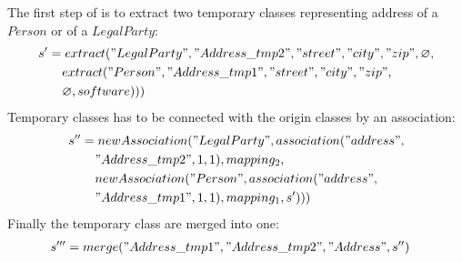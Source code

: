 \documentclass[runningheads]{comsis}
\begin{document}
The first  step of is to extract two temporary classes representing address of a $Person$ or of a $LegalParty$:
\begin{align}
s' &= extract("LegalParty",  "Address\_tmp2", "street", "city", "zip", \varnothing, \nonumber  \\ 
& \;\;\;\; extract("Person", "Address\_tmp1", "street", "city", "zip", \nonumber \\ & \;\;\;\;  \varnothing, software)))
\end{align}
Temporary classes has to be connected with the origin classes by an association:
\begin{align}
 s'' &= newAssociation("LegalParty", association("address", \nonumber \\
& \;\;\;\; "Address\_tmp2", 1, 1), mapping_2, \nonumber \\ & \;\;\;\; newAssociation("Person", association("address",\nonumber  \\
& \;\;\;\; "Address\_tmp1", 1, 1), mapping_1, s')))
\end{align}
Finally the temporary class are merged into one:
\begin{align}
 s''' &= merge("Address\_tmp1", "Address\_tmp2", "Address", s'')
\end{align}
\end{document}
